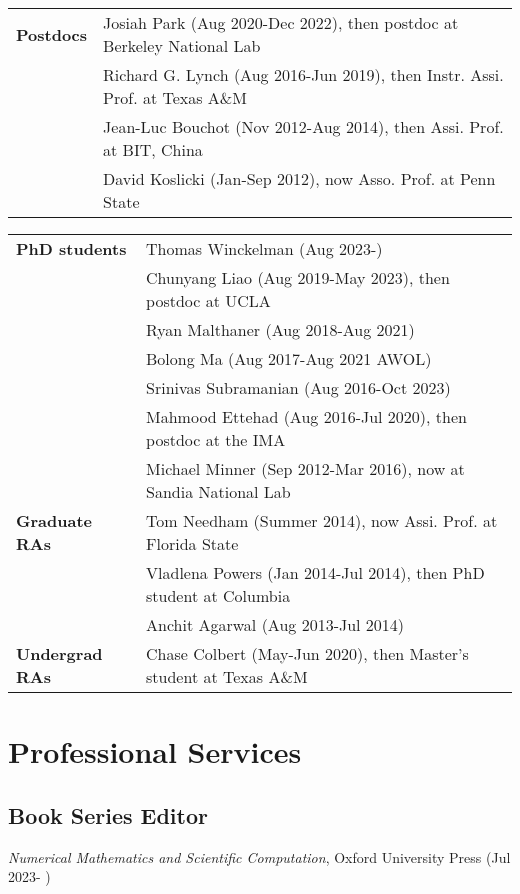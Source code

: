 \documentclass[11pt]{article}
\begin{document}
\begin{tabular}{ll}
{\bf Postdocs \phantom{PhDS}} 
& Josiah Park (Aug 2020-Dec 2022), then postdoc at Berkeley National Lab\\
& Richard  G.  Lynch (Aug 2016-Jun 2019), then Instr. Assi. Prof. at Texas A\&M\\
& Jean-Luc Bouchot (Nov 2012-Aug 2014),
then Assi. Prof. at BIT, China\\
& David Koslicki (Jan-Sep 2012), now 
Asso. Prof. at Penn State
\end{tabular}

\begin{tabular}{ll}
{\bf PhD students}  
& Thomas Winckelman (Aug 2023-)\\
& Chunyang Liao (Aug 2019-May 2023), then postdoc at UCLA\\
& Ryan Malthaner (Aug 2018-Aug 2021)\\
& Bolong Ma (Aug 2017-Aug 2021 AWOL)\\
& Srinivas Subramanian (Aug 2016-Oct 2023) \\
& Mahmood Ettehad (Aug 2016-Jul 2020), then postdoc at the IMA\\
& Michael Minner (Sep 2012-Mar 2016), now at Sandia National Lab\\
{\bf Graduate RAs} & Tom Needham (Summer 2014), now Assi. Prof. at Florida State\\
& Vladlena Powers (Jan 2014-Jul 2014), then PhD student at Columbia\\
& Anchit Agarwal (Aug 2013-Jul 2014)\\
{\bf Undergrad RAs} & Chase Colbert (May-Jun 2020), then Master's student at Texas A\&M
\end{tabular}


\section{Professional Services}

\subsection{Book Series Editor}

\bitemize
\item
{\em Numerical Mathematics and Scientific Computation}, Oxford University Press (Jul 2023- )
\eitemize
\end{document}
